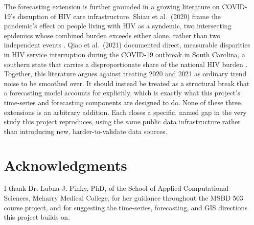 \documentclass[11pt,letterpaper]{article}
\begin{document}
The forecasting extension is further grounded in a growing literature on COVID-19's disruption of HIV care infrastructure. Shiau et al.\ (2020) frame the pandemic's effect on people living with HIV as a syndemic, two intersecting epidemics whose combined burden exceeds either alone, rather than two independent events \cite{shiau2020}. Qiao et al.\ (2021) documented direct, measurable disparities in HIV service interruption during the COVID-19 outbreak in South Carolina, a southern state that carries a disproportionate share of the national HIV burden \cite{qiao2021}. Together, this literature argues against treating 2020 and 2021 as ordinary trend noise to be smoothed over. It should instead be treated as a structural break that a forecasting model accounts for explicitly, which is exactly what this project's time-series and forecasting components are designed to do. None of these three extensions is an arbitrary addition. Each closes a specific, named gap in the very study this project reproduces, using the same public data infrastructure rather than introducing new, harder-to-validate data sources.

\section*{Acknowledgments}
I thank Dr. Lubna J. Pinky, PhD, of the School of Applied Computational Sciences, Meharry Medical College, for her guidance throughout the MSBD 503 course project, and for suggesting the time-series, forecasting, and GIS directions this project builds on.
\end{document}
